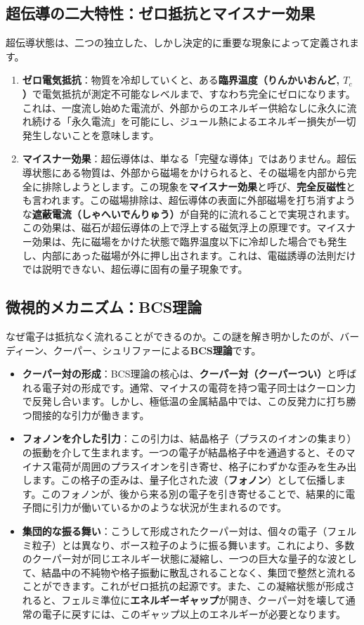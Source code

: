 \documentclass[11pt,a4paper]{ltjsarticle}
\begin{document}
\subsection{超伝導の二大特性：ゼロ抵抗とマイスナー効果}
超伝導状態は、二つの独立した、しかし決定的に重要な現象によって定義されます。
\begin{enumerate}
    \item \textbf{ゼロ電気抵抗}：物質を冷却していくと、ある\textbf{臨界温度（りんかいおんど, $T_c$）}で電気抵抗が測定不可能なレベルまで、すなわち完全にゼロになります\cite{ref1}。これは、一度流し始めた電流が、外部からのエネルギー供給なしに永久に流れ続ける「永久電流」を可能にし、ジュール熱によるエネルギー損失が一切発生しないことを意味します。
    \item \textbf{マイスナー効果}：超伝導体は、単なる「完璧な導体」ではありません。超伝導状態にある物質は、外部から磁場をかけられると、その磁場を内部から完全に排除しようとします。この現象を\textbf{マイスナー効果}と呼び、\textbf{完全反磁性}とも言われます\cite{ref1}。この磁場排除は、超伝導体の表面に外部磁場を打ち消すような\textbf{遮蔽電流（しゃへいでんりゅう）}が自発的に流れることで実現されます\cite{ref13}。この効果は、磁石が超伝導体の上で浮上する磁気浮上の原理です。マイスナー効果は、先に磁場をかけた状態で臨界温度以下に冷却した場合でも発生し、内部にあった磁場が外に押し出されます。これは、電磁誘導の法則だけでは説明できない、超伝導に固有の量子現象です\cite{ref15}。
\end{enumerate}

\subsection{微視的メカニズム：BCS理論}
なぜ電子は抵抗なく流れることができるのか。この謎を解き明かしたのが、バーディーン、クーパー、シュリファーによる\textbf{BCS理論}です\cite{ref1}。
\begin{itemize}
    \item \textbf{クーパー対の形成}：BCS理論の核心は、\textbf{クーパー対（クーパーつい）}と呼ばれる電子対の形成です\cite{ref1}。通常、マイナスの電荷を持つ電子同士はクーロン力で反発し合います。しかし、極低温の金属結晶中では、この反発力に打ち勝つ間接的な引力が働きます。
    \item \textbf{フォノンを介した引力}：この引力は、結晶格子（プラスのイオンの集まり）の振動を介して生まれます。一つの電子が結晶格子中を通過すると、そのマイナス電荷が周囲のプラスイオンを引き寄せ、格子にわずかな歪みを生み出します。この格子の歪みは、量子化された波（\textbf{フォノン}）として伝播します。このフォノンが、後から来る別の電子を引き寄せることで、結果的に電子間に引力が働いているかのような状況が生まれるのです\cite{ref18}。
    \item \textbf{集団的な振る舞い}：こうして形成されたクーパー対は、個々の電子（フェルミ粒子）とは異なり、ボース粒子のように振る舞います。これにより、多数のクーパー対が同じエネルギー状態に凝縮し、一つの巨大な量子的な波として、結晶中の不純物や格子振動に散乱されることなく、集団で整然と流れることができます。これがゼロ抵抗の起源です。また、この凝縮状態が形成されると、フェルミ準位に\textbf{エネルギーギャップ}が開き、クーパー対を壊して通常の電子に戻すには、このギャップ以上のエネルギーが必要となります\cite{ref1}。
\end{itemize}
\end{document}
